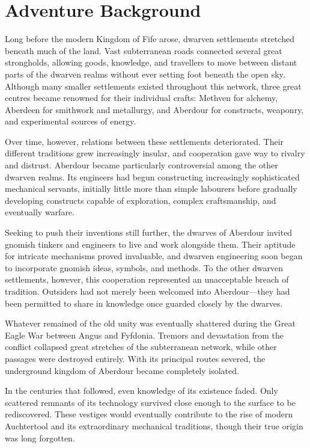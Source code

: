 \section*{\LARGE Adventure Background}
{\entryfont Long before the modern Kingdom of Fife arose, dwarven settlements stretched beneath much of the land. Vast subterranean roads connected several great strongholds, allowing goods, knowledge, and travellers to move between distant parts of the dwarven realms without ever setting foot beneath the open sky. Although many smaller settlements existed throughout this network, three great centres became renowned for their individual crafts: Methven for alchemy, Aberdeen for smithwork and metallurgy, and Aberdour for constructs, weaponry, and experimental sources of energy.

Over time, however, relations between these settlements deteriorated. Their different traditions grew increasingly insular, and cooperation gave way to rivalry and distrust. Aberdour became particularly controversial among the other dwarven realms. Its engineers had begun constructing increasingly sophisticated mechanical servants, initially little more than simple labourers before gradually developing constructs capable of exploration, complex craftsmanship, and eventually warfare.

Seeking to push their inventions still further, the dwarves of Aberdour invited gnomish tinkers and engineers to live and work alongside them. Their aptitude for intricate mechanisms proved invaluable, and dwarven engineering soon began to incorporate gnomish ideas, symbols, and methods. To the other dwarven settlements, however, this cooperation represented an unacceptable breach of tradition. Outsiders had not merely been welcomed into Aberdour—they had been permitted to share in knowledge once guarded closely by the dwarves.

Whatever remained of the old unity was eventually shattered during the Great Eagle War between Angus and Fyfdonia. Tremors and devastation from the conflict collapsed great stretches of the subterranean network, while other passages were destroyed entirely. With its principal routes severed, the underground kingdom of Aberdour became completely isolated.

In the centuries that followed, even knowledge of its existence faded. Only scattered remnants of its technology survived close enough to the surface to be rediscovered. These vestiges would eventually contribute to the rise of modern Auchtertool and its extraordinary mechanical traditions, though their true origin was long forgotten.}

